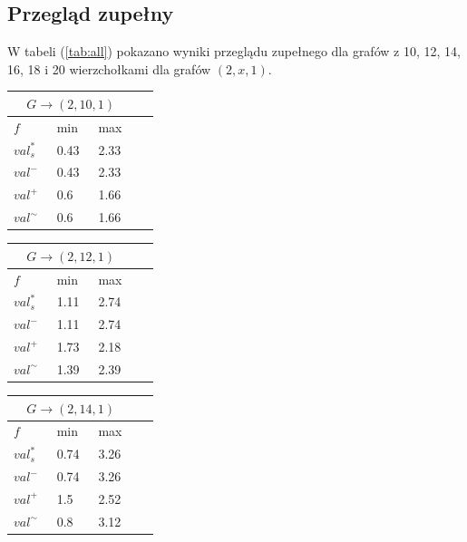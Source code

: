 \documentclass[10pt]{article}
\begin{document}
\subsection{Przegląd zupełny}
W tabeli (\ref{tab:all}) pokazano wyniki przeglądu zupełnego dla grafów z 10, 12, 14, 16, 18 i 20 wierzchołkami dla grafów $(2, x, 1)$.
\filbreak
\begin{center}
  \begin{tabular}{|C{0.08\linewidth}|C{0.08\linewidth}|C{0.08\linewidth}|C{0.08\linewidth}|}
    \hline
     \\ \hline
    $f$          & min  & max   \\ \hline
    $val^*_s$    & 0.43 & 2.33  \\ \hline
    ${val}^-$    & 0.43 & 2.33  \\ \hline
    ${val}^+$    & 0.6  & 1.66  \\ \hline
    ${val}^\sim$ & 0.6  & 1.66  \\ \hline
  \end{tabular}
  \begin{tabular}{|C{0.08\linewidth}|C{0.08\linewidth}|C{0.08\linewidth}|C{0.08\linewidth}|}
    \hline
     \\ \hline
    $f$          & min  & max  \\ \hline
    $val^*_s$    & 1.11 & 2.74 \\ \hline
    ${val}^-$    & 1.11 & 2.74 \\ \hline
    ${val}^+$    & 1.73 & 2.18 \\ \hline
    ${val}^\sim$ & 1.39 & 2.39 \\ \hline
  \end{tabular}
  \begin{tabular}{|C{0.08\linewidth}|C{0.08\linewidth}|C{0.08\linewidth}|C{0.08\linewidth}|}
    \hline
     \\ \hline
    $f$          & min  & max  \\ \hline
    $val^*_s$    & 0.74 & 3.26 \\ \hline
    ${val}^-$    & 0.74 & 3.26 \\ \hline
    ${val}^+$    & 1.5  & 2.52 \\ \hline
    ${val}^\sim$ & 0.8  & 3.12 \\ \hline
  \end{tabular}

\end{center}
\end{document}
